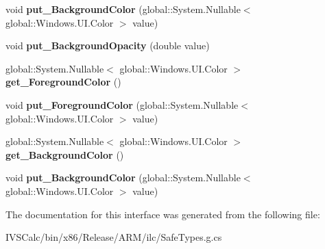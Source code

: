 \begin{DoxyCompactItemize}
\item 
\mbox{\label{interface_windows_1_1_u_i_1_1_view_management_1_1_i_status_bar_a8bbd89095cf7637143e01eeacd3b8718}} 
void {\bfseries put\+\_\+\+Background\+Color} (global\+::\+System.\+Nullable$<$ global\+::\+Windows.\+U\+I.\+Color $>$ value)
\item 
\mbox{\label{interface_windows_1_1_u_i_1_1_view_management_1_1_i_status_bar_af58d730803477f79f79eadd2a909a319}} 
void {\bfseries put\+\_\+\+Background\+Opacity} (double value)
\item 
\mbox{\label{interface_windows_1_1_u_i_1_1_view_management_1_1_i_status_bar_af79d7da2c641f838f1b1ecf0141d571b}} 
global\+::\+System.\+Nullable$<$ global\+::\+Windows.\+U\+I.\+Color $>$ {\bfseries get\+\_\+\+Foreground\+Color} ()
\item 
\mbox{\label{interface_windows_1_1_u_i_1_1_view_management_1_1_i_status_bar_a03c9739bb308ccc616d87f58bc05687f}} 
void {\bfseries put\+\_\+\+Foreground\+Color} (global\+::\+System.\+Nullable$<$ global\+::\+Windows.\+U\+I.\+Color $>$ value)
\item 
\mbox{\label{interface_windows_1_1_u_i_1_1_view_management_1_1_i_status_bar_a9df6bc15ee0dfa95e094167c8cce06b0}} 
global\+::\+System.\+Nullable$<$ global\+::\+Windows.\+U\+I.\+Color $>$ {\bfseries get\+\_\+\+Background\+Color} ()
\item 
\mbox{\label{interface_windows_1_1_u_i_1_1_view_management_1_1_i_status_bar_a8bbd89095cf7637143e01eeacd3b8718}} 
void {\bfseries put\+\_\+\+Background\+Color} (global\+::\+System.\+Nullable$<$ global\+::\+Windows.\+U\+I.\+Color $>$ value)
\end{DoxyCompactItemize}


The documentation for this interface was generated from the following file\+:\begin{DoxyCompactItemize}
\item 
I\+V\+S\+Calc/bin/x86/\+Release/\+A\+R\+M/ilc/Safe\+Types.\+g.\+cs\end{DoxyCompactItemize}
